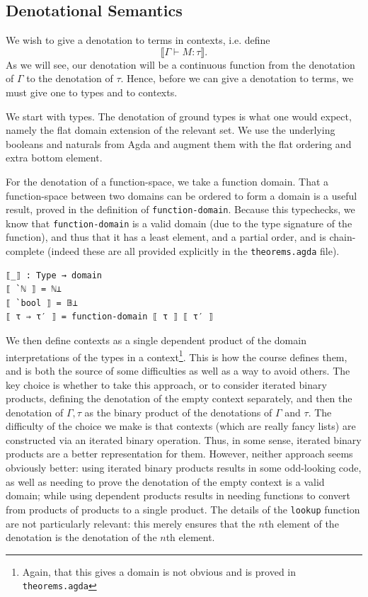 \documentclass[12pt,a4paper,twoside,openright]{report}
\begin{document}
\subsection{Denotational Semantics}
We wish to give a denotation to terms in contexts, i.e. define 
\[
\llbracket \Gamma \vdash M : \tau \rrbracket.
\]
As we will see, our denotation will be a continuous function from the denotation of $\Gamma$ to the denotation of $\tau$. Hence, before we can give a denotation to terms, we must give one to types and to contexts. 

We start with types. The denotation of ground types is what one would expect, namely the flat domain extension of the relevant set. We use the underlying booleans and naturals from Agda and augment them with the flat ordering and extra bottom element. 

For the denotation of a function-space, we take a function domain. That a function-space between two domains can be ordered to form a domain is a useful result, proved in the definition of \texttt{function-domain}. Because this typechecks, we know that \texttt{function-domain} is a valid domain (due to the type signature of the function), and thus that it has a least element, and a partial order, and is chain-complete (indeed these are all provided explicitly in the \texttt{theorems.agda} file). 
\begin{verbatim}
⟦_⟧ : Type → domain
⟦ `ℕ ⟧ = ℕ⊥
⟦ `bool ⟧ = 𝔹⊥
⟦ τ ⇒ τ′ ⟧ = function-domain ⟦ τ ⟧ ⟦ τ′ ⟧
\end{verbatim}
We then define contexts as a single dependent product of the domain interpretations of the types in a context\footnote{Again, that this gives a domain is not obvious and is proved in \texttt{theorems.agda} }. This is how the course defines them, and is both the source of some difficulties as well as a way to avoid others. The key choice is whether to take this approach, or to consider iterated binary products, defining the denotation of the empty context separately, and then the denotation of $\Gamma, \tau$ as the binary product of the denotations of $\Gamma$ and $\tau$. The difficulty of the choice we make is that contexts (which are really fancy lists) are constructed via an iterated binary operation. Thus, in some sense, iterated binary products are a better representation for them. However, neither approach seems obviously better: using iterated binary products results in some odd-looking code, as well as needing to prove the denotation of the empty context is a valid domain; while using dependent products results in needing functions to convert from products of products to a single product. The details of the \texttt{lookup} function are not particularly relevant: this merely ensures that the $n$th element of the denotation is the denotation of the $n$th element. 
\end{document}
